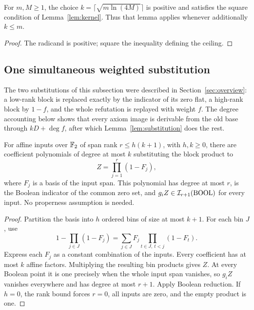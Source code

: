 \begin{corollary}\label{cor:kernel-parameter}
For \(m,M\ge1\), the choice \(k=\lceil\sqrt{m\ln(4M)}\rceil\) is
positive and satisfies the square condition of Lemma~\ref{lem:kernel}.
Thus that lemma applies whenever additionally \(k\le m\).
\end{corollary}
\begin{proof}
The radicand is positive; square the inequality defining the ceiling.
\end{proof}

\subsection{One simultaneous weighted substitution}

The two substitutions of this subsection were described in
Section~\ref{sec:overview}: a low-rank block is replaced exactly by the
indicator of its zero flat, a high-rank block by \(1-f\), and the whole
refutation is replayed with weight \(f\). The degree accounting below shows
that every axiom image is derivable from the old base through \(kD+\deg f\),
after which Lemma~\ref{lem:substitution} does the rest.

\begin{lemma}\label{lem:packing}
For affine inputs over \(\mathbb F_2\) of span rank \(r\le h(k+1)\), with
\(h,k\ge0\), there are coefficient polynomials of degree at most \(k\)
substituting the block product to
\[
 Z=\prod_{j=1}^r(1-F_j),
\]
where \(F_j\) is a basis of the input span. This polynomial has degree
at most \(r\), is the Boolean indicator of the common zero set, and
\(g_iZ\in\mathcal I_{r+1}(\operatorname{BOOL})\) for every input. No properness assumption
is needed.
\end{lemma}
\begin{proof}
Partition the basis into \(h\) ordered bins of size at most \(k+1\).
For each bin \(J\), use
\[
 1-\prod_{j\in J}(1-F_j)
   =\sum_{j\in J} F_j\prod_{t\in J,\ t<j}(1-F_t).
\]
Express each \(F_j\) as a constant combination of the inputs. Every
coefficient has at most \(k\) affine factors. Multiplying the resulting
bin products gives \(Z\). At every Boolean point it is one precisely
when the whole input span vanishes, so \(g_iZ\) vanishes everywhere and
has degree at most \(r+1\). Apply Boolean reduction. If \(h=0\), the
rank bound forces \(r=0\), all inputs are zero, and the empty product is one.
\end{proof}

